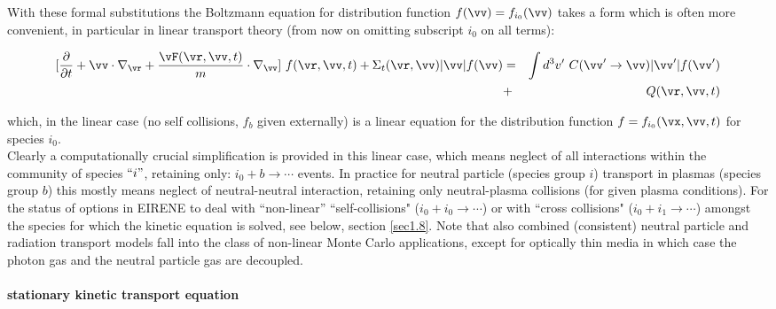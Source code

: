 With these formal substitutions the Boltzmann equation for distribution function $f(\vv) = f_{i_0}(\vv)$ takes a
form which is often more convenient, in particular in linear
transport theory (from now on omitting subscript $i_0$ on all terms):

\renewcommand{\theequation}{1.1b}
\begin{eqnarray} \label{eq1b}
\lbrack\frac\partial{\partial t} + \vv \cdot
\nabla_{\vr} +
\frac{\vF(\vr,\vv,t)}{m} \cdot
\nabla_{\vv}\rbrack \ f(\vr,\vv,t) +
\Sigma_t(\vr,\vv) |\vv|
f(\vv)
  &=&
\int d^3{v}' \ C(\vv' \rightarrow \vv)
|\vv'|
f(\vv') \nonumber \\
&+& Q(\vr,\vv,t)
\end{eqnarray}
\renewcommand{\theequation}{\arabic{section}.\arabic{equation}}
\addtocounter{equation}{-1}
which, in the linear case (no self collisions, $f_b$ given externally) is a linear equation for the distribution
function $f = f_{i_0}(\vx,\vv,t)$ for species $i_0$.
\\
Clearly a computationally crucial simplification is provided in this linear case, which means neglect of all
interactions within the community of species $``i"$, retaining only: $i_0 + b \rightarrow \cdots$ events.
In practice for neutral particle (species group $i$) transport in plasmas (species group $b$) this mostly means neglect of neutral-neutral interaction,
retaining only neutral-plasma collisions (for given plasma conditions).
For the status of options in EIRENE to deal with ``non-linear''
``self-collisions" ($i_0 + i_0 \rightarrow \cdots$)  or with ``cross collisions" ($i_0 + i_1 \rightarrow \cdots$) amongst the
species for which the kinetic equation is solved, see below, section \ref{sec1.8}. Note that also combined (consistent) neutral particle and
radiation transport models fall into the class of non-linear Monte Carlo applications, except for optically thin media in which case the photon gas
and the neutral particle gas are decoupled.
\\
\paragraph{stationary kinetic transport equation} \mbox{}\\

